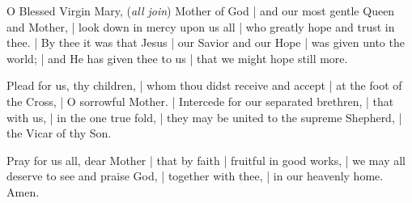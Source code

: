 \begin{enpars}
{\par}

{\par}


\lettrine{O}{} Blessed Virgin Mary, (\textit{all join}) Mother of God | and our most gentle Queen and Mother, | look down in mercy upon us all | who greatly hope and trust in thee. | By thee it was that Jesus | our Savior and our Hope | was given unto the world; | and He has given thee to us | that we might hope still more.

Plead for us, thy children, | whom thou didst receive and accept | at the foot of the Cross, | O sorrowful Mother. | Intercede for our separated brethren, | that with us, | in the one true fold, | they may be united to the supreme Shepherd, | the Vicar of thy Son.

Pray for us all, dear Mother | that by faith | fruitful in good works, | we may all deserve to see and praise God, | together with thee, | in our heavenly home. Amen.\end{enpars}



